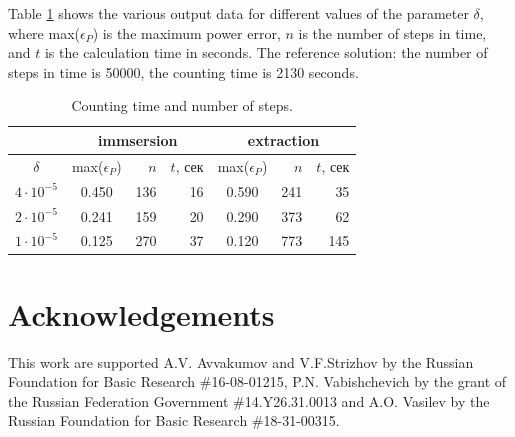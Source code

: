 \documentclass[runningheads]{llncs}
\begin{document}
Table \ref{t-2} shows the various output data for different values of the parameter $\delta$, where max($\epsilon_P$) is the maximum power error, $n$ is the number of steps in time, and $t$ is the calculation time in seconds.
The reference solution: the number of steps in time is 50000, the counting time is 2130 seconds.
\begin{table}[ht]
\caption{Counting time and number of steps.}
\label{t-2}
\begin{center}
\begin{tabular}{ccrrcrr}
&\multicolumn{3}{c}{immsersion} & \multicolumn{3}{c}{extraction}\\
\hline
$\delta$ & max($\epsilon_P$) & $n$ & $t$, сек & max($\epsilon_P$)  & $n$ & $t$, сек \\
\hline
$4\cdot 10^{-5}$ & 0.450 & 136 & 16 & 0.590 & 241 & 35 \\
$2\cdot 10^{-5}$ & 0.241 & 159 & 20 & 0.290 & 373 & 62 \\
$1\cdot 10^{-5}$ & 0.125 & 270 & 37 & 0.120 & 773 & 145 \\
\hline
\end{tabular}
\end{center}
\end{table}

\section*{Acknowledgements}
This work are supported A.V. Avvakumov and V.F.Strizhov by the Russian Foundation for Basic Research \#16-08-01215, P.N. Vabishchevich by the grant of the Russian Federation Government \#14.Y26.31.0013 and A.O. Vasilev by the Russian Foundation for Basic Research \#18-31-00315.
\end{document}
